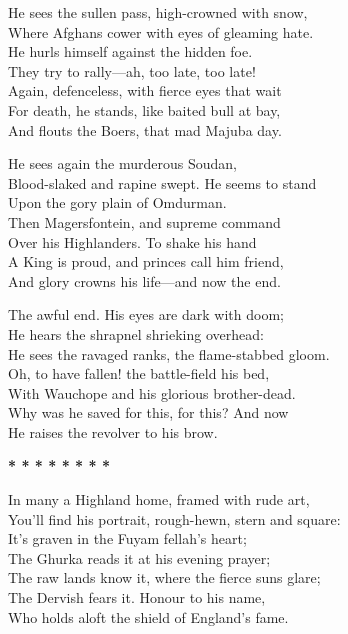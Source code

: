 \begin{poemblock}
He sees the sullen pass, high-crowned with snow,\\
\hspace*{3em}Where Afghans cower with eyes of gleaming hate.\\
He hurls himself against the hidden foe.\\
\hspace*{3em}They try to rally—ah, too late, too late!\\
\hspace*{3em}Again, defenceless, with fierce eyes that wait\\
For death, he stands, like baited bull at bay,\\
And flouts the Boers, that mad Majuba day.

He sees again the murderous Soudan,\\
\hspace*{3em}Blood-slaked and rapine swept. He seems to stand\\
Upon the gory plain of Omdurman.\\
\hspace*{3em}Then Magersfontein, and supreme command\\
\hspace*{3em}Over his Highlanders. To shake his hand\\
A King is proud, and princes call him friend,\\
And glory crowns his life—and now the end.

The awful end. His eyes are dark with doom;\\
\hspace*{3em}He hears the shrapnel shrieking overhead:\\
He sees the ravaged ranks, the flame-stabbed gloom.\\
\hspace*{3em}Oh, to have fallen! the battle-field his bed,\\
\hspace*{3em}With Wauchope and his glorious brother-dead.\\
Why was he saved for this, for this? And now\\
He raises the revolver to his brow.

\centerline{\textbf{*   *   *   *   *   *   *   *}}

In many a Highland home, framed with rude art,\\
\hspace*{3em}You'll find his portrait, rough-hewn, stern and square:\\
It's graven in the Fuyam fellah's heart;\\
\hspace*{3em}The Ghurka reads it at his evening prayer;\\
\hspace*{3em}The raw lands know it, where the fierce suns glare;\\
The Dervish fears it. Honour to his name,\\
Who holds aloft the shield of England's fame.


\end{poemblock}
